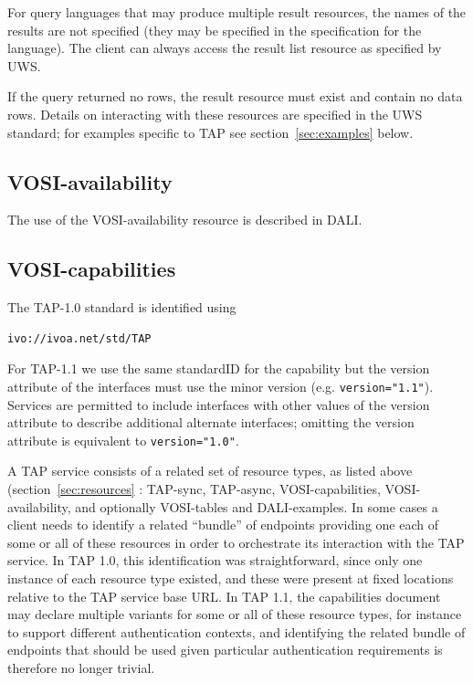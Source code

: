 \documentclass[11pt,letter]{ivoa}
\begin{document}
For query languages that may produce multiple result resources, the names of the 
results are not specified (they may be specified in the specification for the 
language). The client can always access the result list resource as specified by 
UWS.

If the query returned no rows, the result resource must exist and contain no 
data rows. Details on interacting with these resources are specified in the UWS 
standard; for examples specific to TAP see section~\ref{sec:examples} below.

\subsection{VOSI-availability}
\label{sec:vosi-availability}

The use of the VOSI-availability resource is described in DALI.

\subsection{VOSI-capabilities}
\label{sec:vosi-capabilities}

The TAP-1.0 standard is identified using 
\begin{verbatim}
ivo://ivoa.net/std/TAP
\end{verbatim}

For TAP-1.1 we use the same standardID for the capability but the version attribute of the interfaces must
use the minor version (e.g. \verb|version="1.1"|). Services are permitted to include interfaces with other
values of the version attribute to describe additional alternate interfaces; omitting the version attribute 
is equivalent to \verb|version="1.0"|. 

A TAP service consists of a related set of resource types, as listed above (section~\ref{sec:resources} : TAP-sync, TAP-async, VOSI-capabilities, VOSI-availability, and optionally VOSI-tables and DALI-examples. In some cases a client needs to identify a related ``bundle'' of endpoints providing one each of some or all of these resources in order to orchestrate its interaction with the TAP service. In TAP 1.0, this identification was straightforward, since only one instance of each resource type existed, and these were present at fixed locations relative to the TAP service base URL. In TAP 1.1, the capabilities document may declare multiple variants for some or all of these resource types, for instance to support different authentication contexts, and identifying the related bundle of endpoints that should be used given particular authentication requirements is therefore no longer trivial. 
\end{document}
